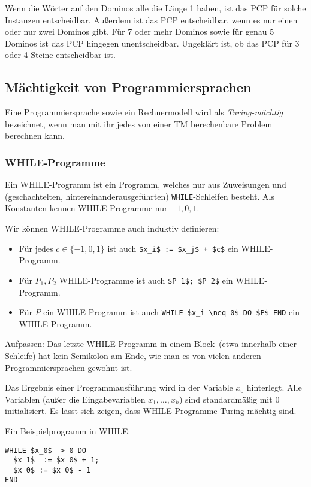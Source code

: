 \documentclass[a4paper,parskip=half*,DIV=7,fontsize=11pt]{scrartcl}
\begin{document}
Wenn die Wörter auf den Dominos alle die Länge 1 haben, ist das PCP für solche Instanzen entscheidbar. Außerdem ist das PCP entscheidbar, wenn es nur einen oder nur zwei Dominos gibt. Für 7 oder mehr Dominos sowie für genau 5 Dominos ist das PCP hingegen unentscheidbar. Ungeklärt ist, ob das PCP für 3 oder 4 Steine entscheidbar ist.

\subsection{Mächtigkeit von Programmiersprachen}
Eine Programmiersprache sowie ein Rechnermodell wird als \emph{Turing-mächtig} bezeichnet, wenn man mit ihr jedes von einer TM berechenbare Problem berechnen kann.

\subsubsection{WHILE-Programme}
Ein  WHILE-Programm  ist ein Programm, welches nur aus Zuweisungen und  (geschachtelten, hintereinanderausgeführten) \lstinline{WHILE}-Schleifen besteht. Als Konstanten kennen WHILE-Programme nur $-1, 0, 1$. 

Wir können WHILE-Programme auch induktiv definieren:
\begin{itemize}
\item Für jedes $c \in \{-1, 0, 1\}$ ist auch \lstinline{$x_i$ := $x_j$ + $c$} ein WHILE-Programm.
\item Für $P_1, P_2$ WHILE-Programme ist auch \lstinline{$P_1$; $P_2$} ein WHILE-Programm.
\item Für $P$ ein WHILE-Programm ist auch \lstinline{WHILE $x_i \neq 0$ DO $P$ END} ein WHILE-Programm.
\end{itemize}

Aufpassen: Das letzte WHILE-Programm in einem \glqq Block\grqq\ (etwa innerhalb einer Schleife) hat kein Semikolon am Ende, wie man es von vielen anderen Programmiersprachen gewohnt ist.

Das Ergebnis einer Programmausführung wird in der Variable $x_0$ hinterlegt. Alle Variablen (außer die Eingabevariablen $x_1,\ldots,x_k$) sind standardmäßig mit $0$ initialisiert. Es lässt sich zeigen, dass  WHILE-Programme Turing-mächtig sind.

Ein Beispielprogramm in WHILE:

\begin{lstlisting}
WHILE $x_0$  > 0 DO
  $x_1$  := $x_0$ + 1;
  $x_0$ := $x_0$ - 1
END
\end{lstlisting}
\end{document}
